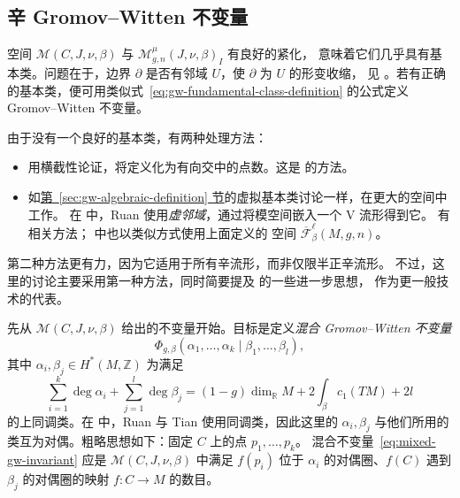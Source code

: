 \subsection{辛 Gromov--Witten 不变量}\label{subsec:symplectic-gw-invariants}
空间 $\mathcal M(C,J,\nu,\beta)$ 与 $\mathcal M^\mu_{g,n}(J,\nu,\beta)_I$ 有良好的紧化，
意味着它们几乎具有基本类。问题在于，边界 $\partial$ 是否有邻域 $U$，使 $\partial$ 为 $U$ 的形变收缩，
见 。若有正确的基本类，便可用类似式~\eqref{eq:gw-fundamental-class-definition}
的公式定义 Gromov--Witten 不变量。

由于没有一个良好的基本类，有两种处理方法：
\begin{itemize}
\item 用横截性论证，将定义化为有向交中的点数。这是  的方法。
\item 如\hyperref[sec:gw-algebraic-definition]{第~\ref*{sec:gw-algebraic-definition} 节}的虚拟基本类讨论一样，在更大的空间中工作。
在  中，Ruan 使用\emph{虚邻域}，通过将模空间嵌入一个 V 流形得到它。
 有相关方法； 中也以类似方式使用上面定义的
空间 $\overline{\mathcal F}^{\ell}_\beta(M,g,n)$。
\end{itemize}
第二种方法更有力，因为它适用于所有辛流形，而非仅限半正辛流形。
不过，这里的讨论主要采用第一种方法，同时简要提及  的一些进一步思想，
作为更一般技术的代表。

先从 $\mathcal M(C,J,\nu,\beta)$ 给出的不变量开始。目标是定义\emph{混合 Gromov--Witten 不变量}
\begin{equation}\label{eq:mixed-gw-invariant}
\Phi_{g,\beta}(\alpha_1,\ldots,\alpha_k\mid\beta_1,\ldots,\beta_l),
\end{equation}
其中 $\alpha_i,\beta_j\in H^*(M,\mathbb Z)$ 为满足
\begin{equation}\label{eq:mixed-gw-degree-condition}
\sum_{i=1}^k\deg\alpha_i+\sum_{j=1}^l\deg\beta_j
=(1-g)\dim_{\mathbb R}M+2\int_\beta c_1(TM)+2l
\end{equation}
的上同调类。在  中，Ruan 与 Tian 使用同调类，因此这里的 $\alpha_i,\beta_j$
与他们所用的类互为对偶。粗略思想如下：固定 $C$ 上的点 $p_1,\ldots,p_k$。
混合不变量~\eqref{eq:mixed-gw-invariant} 应是 $\mathcal M(C,J,\nu,\beta)$ 中满足
$f(p_i)$ 位于 $\alpha_i$ 的对偶圈、$f(C)$ 遇到 $\beta_j$ 的对偶圈的映射 $f:C\to M$ 的数目。

